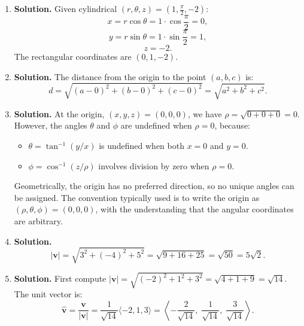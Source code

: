 \begin{enumerate}
Since \( \rho = \sqrt{r^2 + z^2} = \sqrt{9 + 16} = 5 \), and the azimuthal angle \( \theta \) stays the same:
\[
\theta = \frac{\pi}{6}.
\]
The polar angle is:
\[
\phi = \cos^{-1}\!\left(\frac{z}{\rho}\right) = \cos^{-1}\!\left(\frac{4}{5}\right).
\]
Alternatively, \( \phi = \tan^{-1}\!\left(\frac{r}{z}\right) = \tan^{-1}\!\left(\frac{3}{4}\right) \).

The spherical coordinates are \( \left(5,\; \dfrac{\pi}{6},\; \cos^{-1}\!\!\left(\dfrac{4}{5}\right)\right) \).

\item \textbf{Solution.}
Given cylindrical \( (r, \theta, z) = \left(1, \frac{\pi}{2}, -2\right) \):
\[
x = r\cos\theta = 1 \cdot \cos\frac{\pi}{2} = 0,
\]
\[
y = r\sin\theta = 1 \cdot \sin\frac{\pi}{2} = 1,
\]
\[
z = -2.
\]
The rectangular coordinates are \( (0, 1, -2) \).

\item \textbf{Solution.}
The distance from the origin to the point \( (a, b, c) \) is:
\[
d = \sqrt{(a - 0)^2 + (b - 0)^2 + (c - 0)^2} = \sqrt{a^2 + b^2 + c^2}.
\]

\item \textbf{Solution.}
At the origin, \( (x, y, z) = (0, 0, 0) \), we have \( \rho = \sqrt{0 + 0 + 0} = 0 \). However, the angles \( \theta \) and \( \phi \) are undefined when \( \rho = 0 \), because:
\begin{itemize}
    \item \( \theta = \tan^{-1}(y/x) \) is undefined when both \( x = 0 \) and \( y = 0 \).
    \item \( \phi = \cos^{-1}(z/\rho) \) involves division by zero when \( \rho = 0 \).
\end{itemize}
Geometrically, the origin has no preferred direction, so no unique angles can be assigned. The convention typically used is to write the origin as \( (\rho, \theta, \phi) = (0, 0, 0) \), with the understanding that the angular coordinates are arbitrary.

\item \textbf{Solution.}
\[
|\mathbf{v}| = \sqrt{3^2 + (-4)^2 + 5^2} = \sqrt{9 + 16 + 25} = \sqrt{50} = 5\sqrt{2}.
\]

\item \textbf{Solution.}
First compute \( |\mathbf{v}| = \sqrt{(-2)^2 + 1^2 + 3^2} = \sqrt{4 + 1 + 9} = \sqrt{14} \). The unit vector is:
\[
\hat{\mathbf{v}} = \frac{\mathbf{v}}{|\mathbf{v}|} = \frac{1}{\sqrt{14}}\langle -2, 1, 3 \rangle = \left\langle -\frac{2}{\sqrt{14}},\; \frac{1}{\sqrt{14}},\; \frac{3}{\sqrt{14}} \right\rangle.
\]


\end{enumerate}

